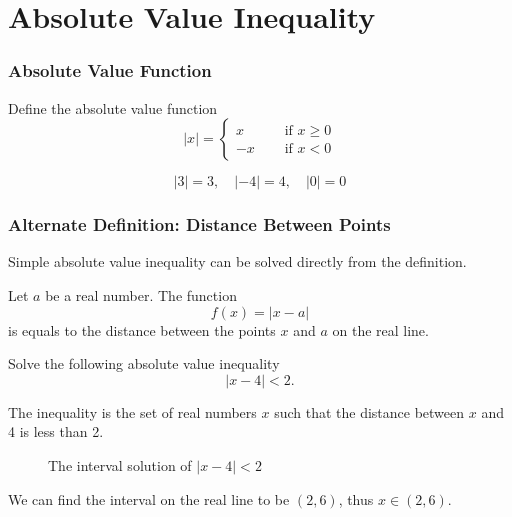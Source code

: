 \iffalse
\section[Absolute Ineq]{Absolute Value Inequality}
\frame{\sectionpage}



\begin{frame}
\frametitle{Absolute Value Function}
\begin{defn}{}{}
Define the absolute value function 
\[|x| = \begin{cases} x \quad &\text{ if } x \geq 0 \\ -x \quad &\text{ if } x < 0 \end{cases}\]
\end{defn}
\begin{ex}
\[|3| = 3, \quad |-4| = 4, \quad |0| = 0\]
\end{ex}
\end{frame}

\begin{frame}
\frametitle{Alternate Definition: Distance Between Points}
Simple absolute value inequality can be solved directly from the definition.
\begin{defn}{}{}
Let $a$ be a real number. The function
\[f(x) = |x - a|\]
is equals to the distance between the points $x$ and $a$ on the real line.
\end{defn}
\end{frame}


\begin{frame}[t]
\begin{ex}
Solve the following absolute value inequality
\[|x-4| < 2.\]
\end{ex}
\begin{sol}
The inequality is the set of real numbers $x$ such that the distance between $x$ and 4 is less than 2. 
\begin{figure}[h!]
\centering
{}
\caption{The interval solution of $|x-4| < 2$}
\end{figure}

We can find the interval on the real line to be $(2,6)$, thus $x \in (2,6)$.
\end{sol}
\end{frame}


